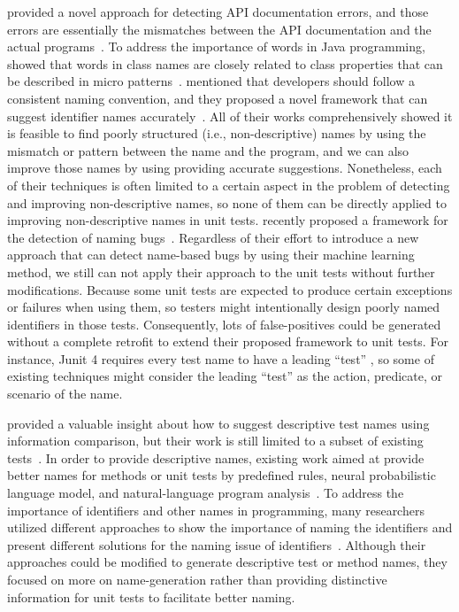\citeauthor{zhong2013detecting} provided a novel approach for detecting API documentation errors, and those errors are essentially the mismatches between the API documentation and the actual programs~\cite{zhong2013detecting}.
%
To address the importance of words in Java programming, \citeauthor{singer2008exploiting} showed that words in class names are closely related to class properties that can be described in micro patterns~\cite{singer2008exploiting}.
%
\citeauthor{allamanis2014learning} mentioned that developers should follow a consistent naming convention, and they proposed a novel framework that can suggest identifier names accurately~\cite{allamanis2014learning}.
%
All of their works comprehensively showed it is feasible to find poorly structured (i.e., non-descriptive) names by using the mismatch or pattern between the name and the program, and we can also improve those names by using providing accurate suggestions.
%
Nonetheless, each of their techniques is often limited to a certain aspect in the problem of detecting and improving non-descriptive names, so none of them can be directly applied to improving non-descriptive names in unit tests.
%
\citeauthor{pradel2018deepbugs} recently proposed a framework for the detection of naming bugs~\cite{pradel2018deepbugs}.
%
Regardless of their effort to introduce a new approach that can detect name-based bugs by using their machine learning method, we still can not apply their approach to the unit tests without further modifications.
%
Because some unit tests are expected to produce certain exceptions or failures when using them, so testers might intentionally design poorly named identifiers in those tests.
%
Consequently, lots of false-positives could be generated without a complete retrofit to extend their proposed framework to unit tests.
%
For instance, Junit 4 requires every test name to have a leading \enquote{test} \cite{JUnit4}, so some of existing techniques might consider the leading \enquote{test} as the action, predicate, or scenario of the name.


 provided a valuable insight about how to suggest descriptive test names using information comparison, but their work is still limited to a subset of existing tests~\cite{wu2020pattern}.
%
In order to provide descriptive names, existing work aimed at provide better names for methods or unit tests by predefined rules, neural probabilistic language model, and natural-language program analysis~\cite{schafer2008sound,zhang2016towards}.
%
To address the importance of identifiers and other names in programming, many researchers utilized different approaches to show the importance of naming the identifiers and present different solutions for the naming issue of identifiers~\cite{takang1996effects,arnaoudova2014repent,lawrie2006s,butler2009relating,butler2010exploring,allamanis2015suggesting}.
%
Although their approaches could be modified to generate descriptive test or method names, they focused on more on name-generation rather than providing distinctive information for unit tests to facilitate better naming.


